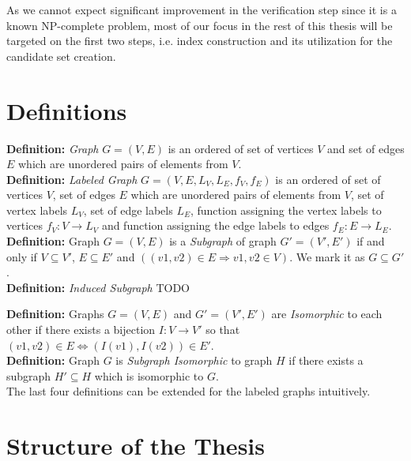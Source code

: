 As we cannot expect significant improvement in the verification step since it is a known NP-complete problem, most of our focus in the rest of this thesis will be targeted on the first two steps, i.e. index construction and its utilization for the candidate set creation.


\section*{Definitions}

\textbf{Definition:} \textit{Graph} $G=(V,E)$ is an ordered of set of vertices $V$ and set of edges $E$ which are unordered pairs of elements from $V$.\\

\noindent \textbf{Definition:} \textit{Labeled Graph} $G=(V,E,L_{V},L_{E},f_{V},f_{E})$ is an ordered of set of vertices $V$, set of edges $E$ which are unordered pairs of elements from $V$, set of vertex labels $L_{V}$,  set of edge labels $L_{E}$, function assigning the vertex labels to vertices $f_{V}: V \longrightarrow L_{V}$ and function assigning the edge labels to edges $f_{E}: E \longrightarrow L_{E}$.\\

\noindent \textbf{Definition:} Graph $G=(V,E)$ is a \textit{Subgraph} of graph $G'=(V',E')$ if and only if $V \subseteq V'$,  $E \subseteq E'$ and $((v1, v2) \in E \Longrightarrow v1, v2 \in V)$. We mark it as $G \subseteq G'$.\\

\noindent \textbf{Definition:} \textit{Induced Subgraph} TODO

\noindent \textbf{Definition:} Graphs $G=(V,E)$ and $G'=(V',E')$ are \textit{Isomorphic} to each other if there exists a bijection $I: V \longrightarrow V'$ so that $(v1,v2) \in E \Leftrightarrow (I(v1),I(v2)) \in E'$.\\

\noindent \textbf{Definition:} Graph $G$ is \textit{Subgraph Isomorphic} to graph $H$ if there exists a subgraph $H' \subseteq H$ which is isomorphic to $G$.\\

\noindent The last four definitions can be extended for the labeled graphs intuitively. 

\section*{Structure of the Thesis}

